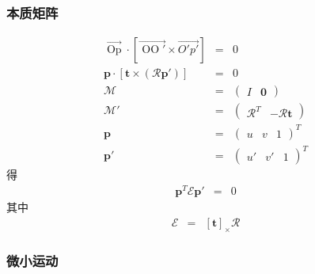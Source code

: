 \documentclass{beamer}
\newcommand{\cdummy}{\cdot}
\newcommand{\tmmathbf}[1]{\ensuremath{\boldsymbol{#1}}}
\newcommand{\tmop}[1]{\ensuremath{\operatorname{#1}}}
\begin{document}
{{\begin{frame}
\end{frame}}{\begin{frame}
  \frametitle{本质矩阵}
  \begin{eqnarray*}
    \overrightarrow{\tmop{Op}} \cdummy [\overrightarrow{\tmop{OO}'} \times
    \overrightarrow{O' p'}] & = & 0\\
    \tmmathbf{p} \cdummy [\tmmathbf{t} \times (\mathcal{R}\tmmathbf{p}')] & =
    & 0\\
    \mathcal{M} & = & \left(\begin{array}{cc}
      I & \tmmathbf{0}
    \end{array}\right)\\
    \mathcal{M}' & = & \left(\begin{array}{cc}
      \mathcal{R}^T & -\mathcal{R}\tmmathbf{t}
    \end{array}\right)\\
    \tmmathbf{p} & = & \left(\begin{array}{ccc}
      u & v & 1
    \end{array}\right)^T\\
    \tmmathbf{p}' & = & \left(\begin{array}{ccc}
      u' & v' & 1
    \end{array}\right)^T
  \end{eqnarray*}
  得
  \begin{eqnarray*}
    \tmmathbf{p}^T \mathcal{E}\tmmathbf{p}' & = & 0
  \end{eqnarray*}
  其中
  \begin{eqnarray*}
    \mathcal{E} & = & [\tmmathbf{t}]_{\times} \mathcal{R}
  \end{eqnarray*}
\end{frame}}{\begin{frame}
  \frametitle{微小运动}
  \begin{eqnarray*}

\end{eqnarray*}
\end{frame}}}
\end{document}
